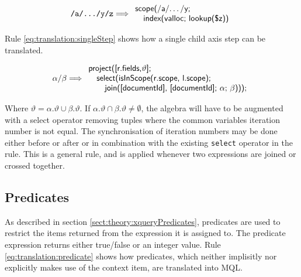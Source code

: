 \begin{equation}
\centering
\texttt{/a/\ldots/y/z}
\Longrightarrow
\begin{array}{l}
	\mbox{\textsf{scope(/a/\ldots/y;}} \\
	\quad \mbox{\textsf{index(valloc; lookup(\$z))}}
\end{array}
\label{eq:translation:pathExpr}
\end{equation}

Rule \ref{eq:translation:singleStep} shows how a single child axis step can be
translated.

\begin{equation}
\centering
\alpha \textsf{/} \beta
\Longrightarrow
\begin{array}{l}
	\mbox{\textsf{project([r.fields,}} \vartheta \mbox{\textsf{];}} \\ \quad
 	\mbox{\textsf{select(isInScope(r.scope, l.scope);}} \\ \quad \quad
 	\mbox{\textsf{join([documentId], [documentId]; }} 
 	\alpha;\, \beta \mbox{\textsf{)))}}; \\
\end{array}
\label{eq:translation:singleStep}
\end{equation}

Where $\vartheta = \alpha.\vartheta \cup \beta.\vartheta$. If $\alpha.\vartheta \cap \beta.\vartheta \neq
\emptyset$, the algebra will have to be augmented with a \textsf{select} operator removing tuples where the common
variables iteration number is not equal. The synchronisation of iteration numbers may be done either before or
after or in combination with the existing \texttt{select} operator in the rule. This is a general rule, and is
applied whenever two expressions are joined or crossed together.

\subsection{Predicates}
\label{sect:translation:mXr:predicates}
As described in section \ref{sect:theory:xqueryPredicates}, predicates are used to restrict the items returned
from the expression it is assigned to. The predicate expression returns either true/false or an integer value. Rule
\ref{eq:translation:predicate} shows how predicates, which neither implisitly nor explicitly makes use of the
context item, are translated into MQL. 

